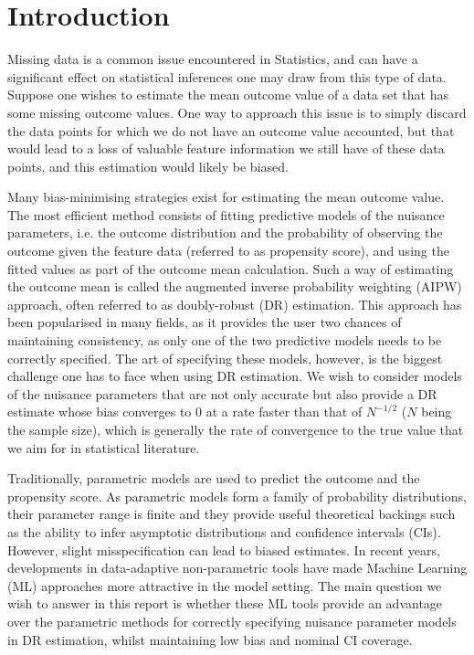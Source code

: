 \documentclass[12pt,twoside]{article}
\begin{document}
\clearpage{\pagestyle{empty}\cleardoublepage}

\tableofcontents 

\clearpage
\listoffigures
\listoftables

\clearpage
{}
\setcounter{page}{1}
\fancyhead[L]{\textsl{\leftmark}}

\section{Introduction} 

Missing data is a common issue encountered in Statistics, and can have a significant effect on statistical inferences one may draw from this type of data. Suppose one wishes to estimate the mean outcome value of a data set that has some missing outcome values. One way to approach this issue is to simply discard the data points for which we do not have an outcome value accounted, but that would lead to a loss of valuable feature information we still have of these data points, and this estimation would likely be biased.

Many bias-minimising strategies exist for estimating the mean outcome value. The most efficient method consists of fitting predictive models of the nuisance parameters, i.e. the outcome distribution and the probability of observing the outcome given the feature data (referred to as propensity score), and using the fitted values as part of the outcome mean calculation. Such a way of estimating the outcome mean is called the augmented inverse probability weighting (AIPW) approach, often referred to as doubly-robust (DR) estimation. This approach has been popularised in many fields, as it provides the user two chances of maintaining consistency, as only one of the two predictive models needs to be correctly specified. The art of specifying these models, however, is the biggest challenge one has to face when using DR estimation. We wish to consider models of the nuisance parameters that are not only accurate but also provide a DR estimate whose bias converges to 0 at a rate faster than that of $N^{-1/2}$ ($N$ being the sample size), which is generally the rate of convergence to the true value that we aim for in statistical literature.

Traditionally, parametric models are used to predict the outcome and the propensity score. As parametric models form a family of probability distributions, their parameter range is finite and they provide useful theoretical backings such as the ability to infer asymptotic distributions and confidence intervals (CIs). However, slight misspecification can lead to biased estimates. In recent years, developments in data-adaptive non-parametric tools have made Machine Learning (ML) approaches more attractive in the model setting. The main question we wish to answer in this report is whether these ML tools provide an advantage over the parametric methods for correctly specifying nuisance parameter models in DR estimation, whilst maintaining low bias and nominal CI coverage.
 
\end{document}
